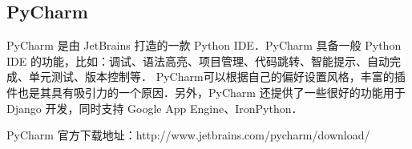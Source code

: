
\begin{issues}
\issueDraft
\issueTODO
\end{issues}

\subsection{PyCharm}
PyCharm 是由 JetBrains 打造的一款 Python IDE．PyCharm 具备一般 Python IDE 的功能，比如：调试、语法高亮、项目管理、代码跳转、智能提示、自动完成、单元测试、版本控制等． PyCharm可以根据自己的偏好设置风格，丰富的插件也是其具有吸引力的一个原因．另外，PyCharm 还提供了一些很好的功能用于 Django 开发，同时支持 Google App Engine、IronPython．

PyCharm 官方下载地址：http://www.jetbrains.com/pycharm/download/
